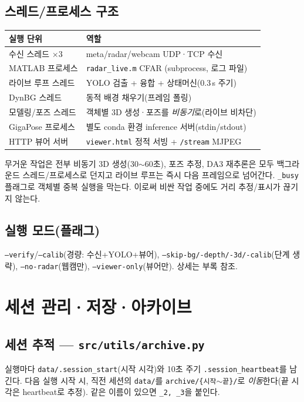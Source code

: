 \section{스레드/프로세스 구조}
\begin{center}
\begin{tabular}{@{}lp{8cm}@{}}
\toprule
실행 단위 & 역할 \\
\midrule
수신 스레드 $\times3$ & meta/radar/webcam UDP·TCP 수신 \\
MATLAB 프로세스    & \texttt{radar\_live.m} CFAR (subprocess, 로그 파일) \\
라이브 루프 스레드 & YOLO 검출 + 융합 + 상태머신(0.3\,s 주기) \\
DynBG 스레드       & 동적 배경 채우기(프레임 폴링) \\
모델링/포즈 스레드 & 객체별 3D 생성·포즈를 \emph{비동기}로(라이브 비차단) \\
GigaPose 프로세스  & 별도 conda 환경 inference 서버(stdin/stdout) \\
HTTP 뷰어 서버     & \texttt{viewer.html} 정적 서빙 + \texttt{/stream} MJPEG \\
\bottomrule
\end{tabular}
\end{center}

\begin{designbox}{무거운 작업은 전부 비동기}
3D 생성(30$\sim$60초), 포즈 추정, DA3 재추론은 모두 백그라운드 스레드/프로세스로
던지고 라이브 루프는 즉시 다음 프레임으로 넘어간다. \texttt{\_busy} 플래그로 객체별
중복 실행을 막는다. 이로써 비싼 작업 중에도 거리 추정/표시가 끊기지 않는다.
\end{designbox}

\section{실행 모드(플래그)}
\texttt{--verify}/\texttt{--calib}(경량: 수신+YOLO+뷰어),
\texttt{--skip-bg/-depth/-3d/-calib}(단계 생략), \texttt{--no-radar}(웹캠만),
\texttt{--viewer-only}(뷰어만). 상세는 부록 참조.

\chapter{세션 관리·저장·아카이브}

\section{세션 추적 — \texttt{src/utils/archive.py}}
실행마다 \texttt{data/.session\_start}(시작 시각)와 10초 주기
\texttt{.session\_heartbeat}를 남긴다. 다음 실행 시작 시, 직전 세션의
\texttt{data/}를 \texttt{archive/\{시작$\sim$끝\}/}로 \emph{이동}한다(끝 시각은
heartbeat로 추정). 같은 이름이 있으면 \texttt{\_2, \_3}을 붙인다.

